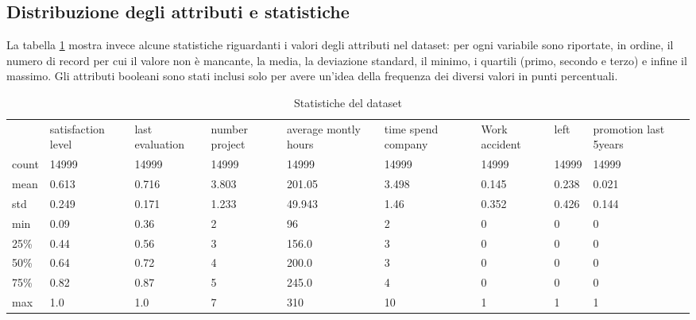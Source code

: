 \documentclass[a4paper]{article}
\begin{document}
\subsection{Distribuzione degli attributi e statistiche}

\noindent La tabella \ref{tab:statistics} mostra invece alcune statistiche riguardanti i valori degli attributi nel dataset: per ogni variabile sono riportate, in ordine, il numero di record per cui il valore non è mancante, la media, la deviazione standard, il minimo, i quartili (primo, secondo e terzo) e infine il massimo. Gli attributi booleani sono stati inclusi solo per avere un'idea della frequenza dei diversi valori in punti percentuali.

\begin{table}[h]
\centering

\setlength{\tabcolsep}{6pt} %
\renewcommand{\arraystretch}{1.3} %

\begin{tabularx}{\textwidth}{|XXXXXXXXX|}
\hline
      & satisfaction level & last evaluation & number project & average montly hours & time spend company & Work accident & left    & promotion last 5years \\
count & 14999             & 14999          & 14999         & 14999                & 14999              & 14999        & 14999 & 14999                 \\
mean  & 0.613               & 0.716            & 3.803           & 201.05                 & 3.498                & 0.145          & 0.238   & 0.021                   \\
std   & 0.249               & 0.171            & 1.233           & 49.943                 & 1.46                 & 0.352          & 0.426   & 0.144                   \\
min   & 0.09                & 0.36             & 2             & 96                   & 2                  & 0            & 0     & 0                     \\
25\%  & 0.44                & 0.56             & 3             & 156.0                  & 3                  & 0            & 0     & 0                     \\
50\%  & 0.64                & 0.72             & 4             & 200.0                  & 3                  & 0            & 0     & 0                     \\
75\%  & 0.82                & 0.87             & 5             & 245.0                  & 4                  & 0            & 0     & 0                     \\
max   & 1.0                 & 1.0              & 7             & 310                  & 10                 & 1            & 1     & 1       \\ \hline       
\end{tabularx}
\caption{Statistiche del dataset}
\label{tab:statistics}
\end{table}
\end{document}
